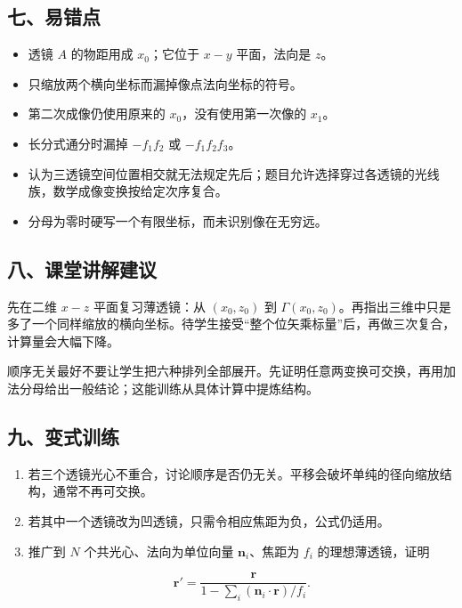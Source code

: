\documentclass[12pt,a4paper,UTF8]{ctexart}
\newcommand{\tightlist}{\setlength{\itemsep}{0pt}\setlength{\parskip}{0pt}}
\begin{document}
\subsection{七、易错点}\label{ux4e03ux6613ux9519ux70b9-5}

\begin{itemize}
\tightlist
\item
  透镜 \(A\) 的物距用成 \(x_0\)；它位于 \(x-y\) 平面，法向是 \(z\)。
\item
  只缩放两个横向坐标而漏掉像点法向坐标的符号。
\item
  第二次成像仍使用原来的 \(x_0\)，没有使用第一次像的 \(x_1\)。
\item
  长分式通分时漏掉 \(-f_1f_2\) 或 \(-f_1f_2f_3\)。
\item
  认为三透镜空间位置相交就无法规定先后；题目允许选择穿过各透镜的光线族，数学成像变换按给定次序复合。
\item
  分母为零时硬写一个有限坐标，而未识别像在无穷远。
\end{itemize}

\subsection{八、课堂讲解建议}\label{ux516bux8bfeux5802ux8bb2ux89e3ux5efaux8bae-5}

先在二维 \(x-z\) 平面复习薄透镜：从 \((x_0,z_0)\) 到
\(\Gamma(x_0,z_0)\)。再指出三维中只是多了一个同样缩放的横向坐标。待学生接受``整个位矢乘标量''后，再做三次复合，计算量会大幅下降。

顺序无关最好不要让学生把六种排列全部展开。先证明任意两变换可交换，再用加法分母给出一般结论；这能训练从具体计算中提炼结构。

\subsection{九、变式训练}\label{ux4e5dux53d8ux5f0fux8badux7ec3-5}

\begin{enumerate}
\def\labelenumi{\arabic{enumi}.}
\item
  若三个透镜光心不重合，讨论顺序是否仍无关。平移会破坏单纯的径向缩放结构，通常不再可交换。
\item
  若其中一个透镜改为凹透镜，只需令相应焦距为负，公式仍适用。
\item
  推广到 \(N\) 个共光心、法向为单位向量 \(\bm n_i\)、焦距为 \(f_i\)
  的理想薄透镜，证明

  \[\bm r'=
  \frac{\bm r}{1-\sum_i(\bm n_i\cdot\bm r)/f_i}.\]
\end{enumerate}
\end{document}
